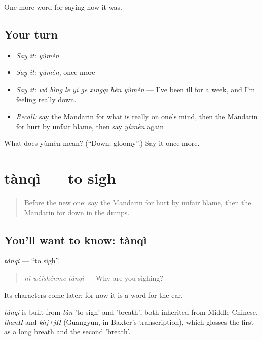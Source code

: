 \begin{grammarlens}[title={What you've built}]
One more word for saying how it was.
\end{grammarlens}

\subsection*{Your turn}
\begin{itemize}
\raggedright
  \item \emph{Say it:} \emph{yùmèn}
  \item \emph{Say it:} \emph{yùmèn}, once more
  \item \emph{Say it:} \emph{wǒ bìng le yí ge xīngqī hěn yùmèn} — I've been ill for a week, and I'm feeling really down.
  \item \emph{Recall:} say the Mandarin for what is really on one's mind, then the Mandarin for hurt by unfair blame, then say \emph{yùmèn} again
\end{itemize}

\begin{tcolorbox}[breakable,colback=teal!4,colframe=teal!35!black,title={Before you move on}]
What does yùmèn mean? (\textquotedblleft{}Down; gloomy\textquotedblright{}.) Say it once more.
\end{tcolorbox}
\section[tànqì]{tànqì — to sigh}

\label{lesson:ZH-C460-tanqi}



\begin{quote}
Before the new one: say the Mandarin for hurt by unfair blame, then the Mandarin for down in the dumps.
\end{quote}

\subsection*{You'll want to know: tànqì}
\emph{tànqì} — \textquotedblleft{}to sigh\textquotedblright{}.

\begin{quote}
\emph{nǐ wèishénme tànqì} — Why are you sighing?
\end{quote}

Its characters come later; for now it is a word for the ear.

\begin{cousinweb}
\emph{tànqì} is built from \emph{tàn} 'to sigh' and  'breath', both inherited from Middle Chinese, \emph{thanH} and \emph{khj+jH} (Guangyun, in Baxter's transcription), which glosses the first as a long breath and the second 'breath'.
\end{cousinweb}

